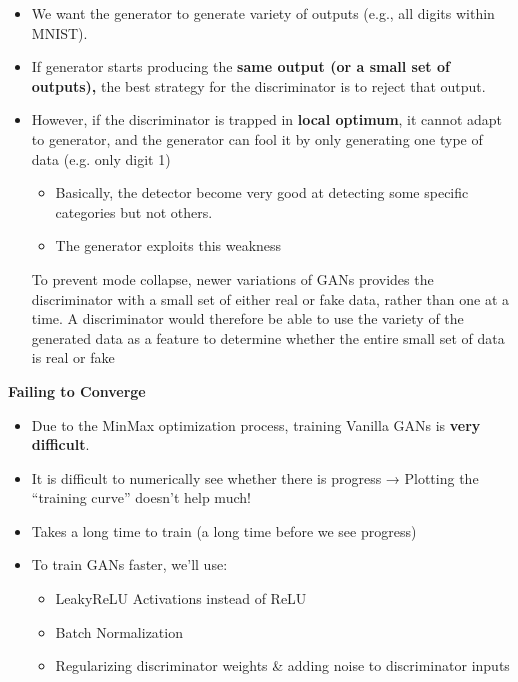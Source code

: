 \begin{itemize}
    \item We want the generator to generate variety of outputs (e.g., all digits within MNIST).
    \item If generator starts producing the\textbf{ same output (or a small set of outputs),} the best strategy for the discriminator is to reject that output.
    \item However, if the discriminator is trapped in \textbf{local optimum}, it cannot adapt to generator, and the generator can fool it by only generating one type of data (e.g. only digit 1)
    \begin{itemize}
        \item Basically, the detector become very good at detecting some specific categories but not others.
        \item The generator exploits this weakness
    \end{itemize}

\begin{idea}
    To prevent mode collapse, newer variations of GANs provides the discriminator with a small set of either real or fake data, rather than one at a time. A discriminator would therefore be able to use the variety of the generated data as a feature to determine whether the entire small set of data is real or fake
\end{idea}
\end{itemize}
\noindent
\textbf{Failing to Converge}
\begin{itemize}
    \item Due to the MinMax optimization process, training Vanilla GANs is \textbf{very difficult}.
    \item It is difficult to numerically see whether there is progress → Plotting the “training curve” doesn’t help much!
    \item Takes a long time to train (a long time before we see progress)
    \item To train GANs faster, we’ll use:
    \begin{itemize}
        \item LeakyReLU Activations instead of ReLU
        \item Batch Normalization
        \item Regularizing discriminator weights \& adding noise to discriminator inputs
    \end{itemize}

\end{itemize}


